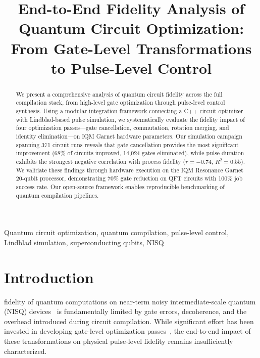 \documentclass[journal]{IEEEtran}
\begin{document}
\title{End-to-End Fidelity Analysis of Quantum Circuit Optimization: From Gate-Level Transformations to Pulse-Level Control}

\author{
}

\maketitle

\begin{abstract}
We present a comprehensive analysis of quantum circuit fidelity across the full compilation stack, from high-level gate optimization through pulse-level control synthesis. Using a modular integration framework connecting a C++ circuit optimizer with Lindblad-based pulse simulation, we systematically evaluate the fidelity impact of four optimization passes---gate cancellation, commutation, rotation merging, and identity elimination---on IQM Garnet hardware parameters. Our simulation campaign spanning 371 circuit runs reveals that gate cancellation provides the most significant improvement (68\% of circuits improved, 14,024 gates eliminated), while pulse duration exhibits the strongest negative correlation with process fidelity ($r = -0.74$, $R^2 = 0.55$). We validate these findings through hardware execution on the IQM Resonance Garnet 20-qubit processor, demonstrating 70\% gate reduction on QFT circuits with 100\% job success rate. Our open-source framework enables reproducible benchmarking of quantum compilation pipelines.
\end{abstract}

\begin{IEEEkeywords}
Quantum circuit optimization, quantum compilation, pulse-level control, Lindblad simulation, superconducting qubits, NISQ
\end{IEEEkeywords}

\section{Introduction}
 fidelity of quantum computations on near-term noisy intermediate-scale quantum (NISQ) devices~\cite{preskill2018quantum} is fundamentally limited by gate errors, decoherence, and the overhead introduced during circuit compilation. While significant effort has been invested in developing gate-level optimization passes~\cite{nam2018automated,kissinger2020reducing,lubasch2025tensor}, the end-to-end impact of these transformations on physical pulse-level fidelity remains insufficiently characterized.
\end{document}
